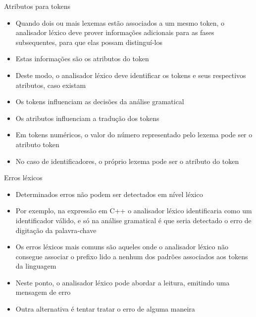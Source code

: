 \begin{frame}[fragile]{Atributos para tokens}

    \begin{itemize}
        \item Quando dois ou mais lexemas estão associados a um mesmo token, o analisador léxico deve prover informações adicionais para as fases subsequentes,
            para que elas possam distinguí-los
        \pause

        \item Estas informações são os atributos do token
        \pause

        \item Deste modo, o analisador léxico deve identificar os tokens e seus respectivos atributos, caso existam
        \pause

        \item Os tokens influenciam as decisões da análise gramatical
        \pause

        \item Os atributos influenciam a tradução dos tokens
        \pause

        \item Em tokens numéricos, o valor do número representado pelo lexema pode ser o atributo token
        \pause

        \item No caso de identificadores, o próprio lexema pode ser o atributo do token
    \end{itemize}

\end{frame}

\begin{frame}[fragile]{Erros léxicos}

    \begin{itemize}
        \item Determinados erros não podem ser detectados em nível léxico
        \pause

        \item Por exemplo, na expressão em C++
        o analisador léxico identificaria  como um identificador válido, e só na análise gramatical é que seria detectado o erro de digitação da
        palavra-chave 
        \pause

        \item Os erros léxicos mais comuns são aqueles onde o analisador léxico não consegue associar o prefixo lido a nenhum dos padrões associados aos tokens
        da linguagem
        \pause

        \item Neste ponto, o analisador léxico pode abordar a leitura, emitindo uma mensagem de erro
        \pause

        \item Outra alternativa é tentar tratar o erro de alguma maneira
    \end{itemize}

\end{frame}

